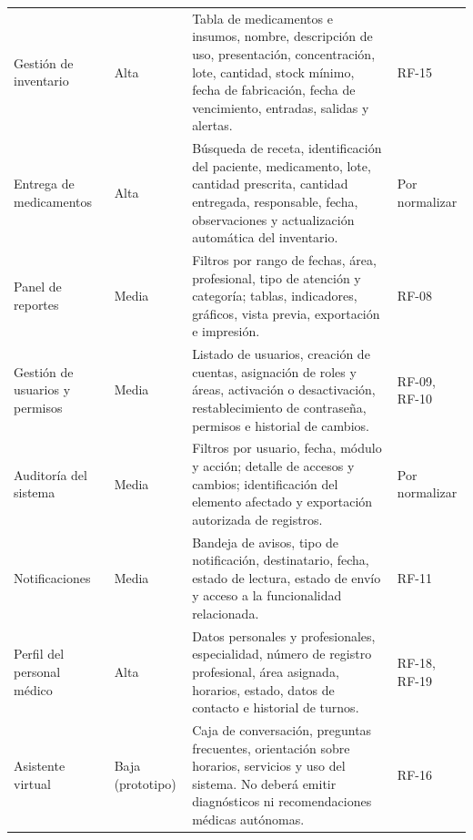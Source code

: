 \documentclass[11pt,a4paper]{article}
\begin{document}
\begin{longtable}{p{} p{} p{} p{}}
		Gestión de inventario &
		Alta &
		Tabla de medicamentos e insumos, nombre, descripción de uso, presentación,
		concentración, lote, cantidad, stock mínimo, fecha de fabricación, fecha de
		vencimiento, entradas, salidas y alertas. &
		RF-15 \\
		
		Entrega de medicamentos &
		Alta &
		Búsqueda de receta, identificación del paciente, medicamento, lote, cantidad
		prescrita, cantidad entregada, responsable, fecha, observaciones y actualización
		automática del inventario. &
		Por normalizar \\
		
		Panel de reportes &
		Media &
		Filtros por rango de fechas, área, profesional, tipo de atención y categoría;
		tablas, indicadores, gráficos, vista previa, exportación e impresión. &
		RF-08 \\
		
		Gestión de usuarios y permisos &
		Media &
		Listado de usuarios, creación de cuentas, asignación de roles y áreas,
		activación o desactivación, restablecimiento de contraseña, permisos e historial
		de cambios. &
		RF-09, RF-10 \\
		
		Auditoría del sistema &
		Media &
		Filtros por usuario, fecha, módulo y acción; detalle de accesos y cambios;
		identificación del elemento afectado y exportación autorizada de registros. &
		Por normalizar \\
		
		Notificaciones &
		Media &
		Bandeja de avisos, tipo de notificación, destinatario, fecha, estado de lectura,
		estado de envío y acceso a la funcionalidad relacionada. &
		RF-11 \\
		
		Perfil del personal médico &
		Alta &
		Datos personales y profesionales, especialidad, número de registro profesional,
		área asignada, horarios, estado, datos de contacto e historial de turnos. &
		RF-18, RF-19 \\
		
		Asistente virtual &
		Baja
		(prototipo) &
		Caja de conversación, preguntas frecuentes, orientación sobre horarios,
		servicios y uso del sistema. No deberá emitir diagnósticos ni recomendaciones
		médicas autónomas. &
		RF-16 \\
		
		\bottomrule
		
	\end{longtable}
	
\end{document}
